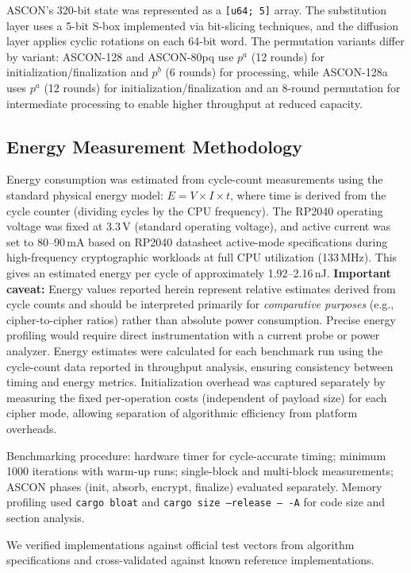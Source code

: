 \documentclass[12pt]{report}
\begin{document}
ASCON's 320-bit state was represented as a \texttt{[u64; 5]} array.
The substitution layer uses a 5-bit S-box implemented via bit-slicing
techniques, and the diffusion layer applies cyclic rotations on each
64-bit word. The permutation variants differ by variant: ASCON-128 and ASCON-80pq use $p^a$ (12 rounds) for initialization/finalization and $p^b$ (6 rounds) for processing, while ASCON-128a uses $p^a$ (12 rounds) for initialization/finalization and an 8-round permutation for intermediate processing to enable higher throughput at reduced capacity.

\subsection*{Energy Measurement Methodology}

Energy consumption was estimated from cycle-count measurements using the standard physical energy model:
$E = V \times I \times t$, where time is derived from the cycle counter (dividing cycles by the CPU frequency).
The RP2040 operating voltage was fixed at 3.3\,V (standard operating voltage), and active current was set to
80--90\,mA based on RP2040 datasheet active-mode specifications during high-frequency cryptographic workloads
at full CPU utilization (133\,MHz). This gives an estimated energy per cycle of approximately 1.92--2.16\,nJ.
\textbf{Important caveat:} Energy values reported herein represent relative estimates derived from cycle counts
and should be interpreted primarily for \emph{comparative purposes} (e.g., cipher-to-cipher ratios) rather than
absolute power consumption. Precise energy profiling would require direct instrumentation with a current probe or
power analyzer. Energy estimates were calculated for each benchmark run using the cycle-count data reported in
throughput analysis, ensuring consistency between timing and energy metrics. Initialization overhead was captured
separately by measuring the fixed per-operation costs (independent of payload size) for each cipher mode, allowing
separation of algorithmic efficiency from platform overheads.

Benchmarking procedure: hardware timer for cycle-accurate timing; minimum 1000 iterations with
warm-up runs; single-block and multi-block measurements; ASCON phases (init, absorb, encrypt,
finalize) evaluated separately. Memory profiling used \texttt{cargo bloat} and \texttt{cargo size
--release -- -A} for code size and section analysis.

We verified implementations against official test vectors from algorithm specifications
and cross-validated against known reference implementations.
\end{document}
